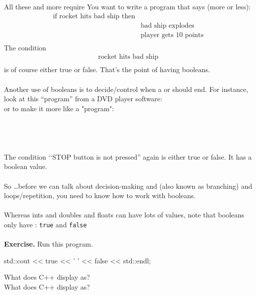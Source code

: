 {All these and more require \textbf{} You want to write a program that says (more or less):\\
\begin{align*}
  \text{if rocket hits bad ship then}\\
& \text{bad ship explodes}\\
& \text{player gets 10 points}\\
\end{align*}
The condition
\begin{align*}
\text{rocket hits bad ship}\\
\end{align*}
is of course either true or false. That's the point of having booleans.\\\\
Another use of booleans is to decide/control when a \textbf{} or \textbf{} should end. For instance, look at this “program” from a DVD player software:\\
or to make it more like a "program":\\
\\
\\
\\\\
The condition \lq\lq STOP button is not pressed'' again is either true or false. It has a boolean value.\\\\
So \dots before we can talk about decision-making and (also known as
branching) and loops/repetition, you need to know how to work with booleans.\\\\
Whereas ints and doubles and floats can have lots of values, note that booleans only have \textbf{}: \verb!true! and \verb!false!\\\\

\textbf{Exercise.} Run this program.\\
\begin{console}
  std::cout << true << ' '
            << false << std::endl;
\end{console}
What does C++ display  as? \underline{\mbox{}\hspace{1in}}\\
What does C++ display  as? \underline{\mbox{}\hspace{1in}}

}
